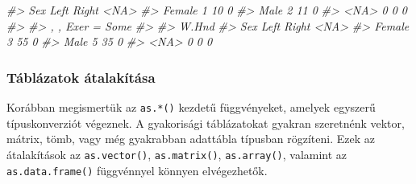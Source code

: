 \documentclass[
]{book}
\newenvironment{Shaded}{\begin{snugshade}}{\end{snugshade}}
\newcommand{\CommentTok}[1]{\textcolor[rgb]{0.56,0.35,0.01}{\textit{#1}}}
\begin{document}
\begin{Shaded}
\begin{Highlighting}[]
\CommentTok{\#\textgreater{} Sex      Left Right \textless{}NA\textgreater{}}
\CommentTok{\#\textgreater{}   Female    1    10    0}
\CommentTok{\#\textgreater{}   Male      2    11    0}
\CommentTok{\#\textgreater{}   \textless{}NA\textgreater{}      0     0    0}
\CommentTok{\#\textgreater{} }
\CommentTok{\#\textgreater{} , , Exer = Some}
\CommentTok{\#\textgreater{} }
\CommentTok{\#\textgreater{}         W.Hnd}
\CommentTok{\#\textgreater{} Sex      Left Right \textless{}NA\textgreater{}}
\CommentTok{\#\textgreater{}   Female    3    55    0}
\CommentTok{\#\textgreater{}   Male      5    35    0}
\CommentTok{\#\textgreater{}   \textless{}NA\textgreater{}      0     0    0}
\end{Highlighting}
\end{Shaded}

\hypertarget{tuxe1bluxe1zatok-uxe1talakuxedtuxe1sa}{%
\subsubsection{Táblázatok átalakítása}\label{tuxe1bluxe1zatok-uxe1talakuxedtuxe1sa}}

Korábban megismertük az \texttt{as.*()} kezdetű függvényeket, amelyek egyszerű típuskonverziót végeznek. A gyakorisági táblázatokat gyakran szeretnénk vektor, mátrix, tömb, vagy még gyakrabban adattábla típusban rögzíteni. Ezek az átalakítások az \texttt{as.vector()}, \texttt{as.matrix()}, \texttt{as.array()}, valamint az \texttt{as.data.frame()} függvénnyel könnyen elvégezhetők.
\end{document}
